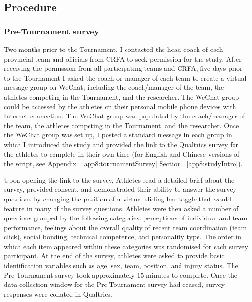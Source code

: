 \begin{CJK}{UTF8}{gbsn}
\subsection{Procedure}

\subsubsection{Pre-Tournament survey}
Two months prior to the Tournament, I contacted the head coach of each provincial team and officials from CRFA to seek permission for the study.  After receiving the permission from all participating teams and CRFA, five days prior to the Tournament I asked the coach or manager of each team to create a virtual message group on WeChat, including the coach/manager of the team, the athletes competing in the Tournament, and the researcher.  The WeChat group could be accessed by the athletes on their personal mobile phone devices with Internet connection. The WeChat group was populated by the coach/manager of the team, the athletes competing in the Tournament, and the researcher. Once the WeChat group was set up, I posted a standard message in each group in which I introduced the study and provided the link to the Qualtrics survey for the athletes to complete in their own time (for English and Chinese versions of the script, see Appendix ~\ref{app8:tournamentSurvey} Section ~\ref{app8:studyIntro}).

Upon opening the link to the survey, Athletes read a detailed brief about the survey, provided consent, and demonstrated their ability to answer the survey questions by changing the position of a virtual sliding bar toggle that would feature in many of the survey questions.  Athletes were then asked a number of questions grouped by the following categories: perceptions of individual and team performance, feelings about the overall quality of recent team coordination (team click), social bonding, technical competence, and personality type. The order in which each item appeared within these categories was randomised for each survey participant. At the end of the survey, athletes were asked to provide basic identification variables such as age, sex, team, position, and injury status.  The Pre-Tournament survey took approximately 15 minutes to complete.  Once the data collection window for the Pre-Tournament survey had ceased, survey responses were collated in Qualtrics.


\end{CJK}
